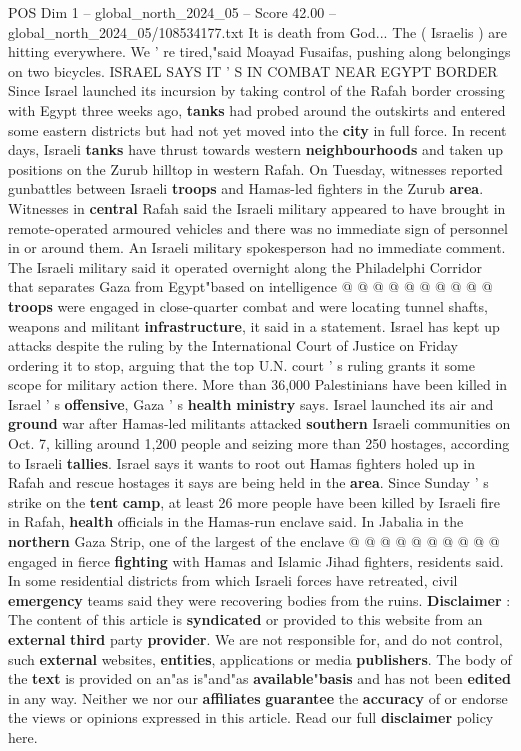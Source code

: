\begin{textsample}{POS Dim 1 – global\_north\_2024\_05 – Score 42.00 – global\_north\_2024\_05/108534177.txt}
It is death from God...
The ( Israelis ) are hitting everywhere.
We ' re tired,"said Moayad Fusaifas, pushing along belongings on two bicycles.
ISRAEL SAYS IT ' S IN COMBAT NEAR EGYPT BORDER Since Israel launched its incursion by taking control of the Rafah border crossing with Egypt three weeks ago, \textbf{tanks} had probed around the outskirts and entered some eastern districts but had not yet moved into the \textbf{city} in full force.
In recent days, Israeli \textbf{tanks} have thrust towards western \textbf{neighbourhoods} and taken up positions on the Zurub hilltop in western Rafah.
On Tuesday, witnesses reported gunbattles between Israeli \textbf{troops} and Hamas-led fighters in the Zurub \textbf{area}.
Witnesses in \textbf{central} Rafah said the Israeli military appeared to have brought in remote-operated armoured vehicles and there was no immediate sign of personnel in or around them.
An Israeli military spokesperson had no immediate comment.
The Israeli military said it operated overnight along the Philadelphi Corridor that separates Gaza from Egypt"based on intelligence @ @ @ @ @ @ @ @ @ @ \textbf{troops} were engaged in close-quarter combat and were locating tunnel shafts, weapons and militant \textbf{infrastructure}, it said in a statement.
Israel has kept up attacks despite the ruling by the International Court of Justice on Friday ordering it to stop, arguing that the top U.N. court ' s ruling grants it some scope for military action there.
More than 36,000 Palestinians have been killed in Israel ' s \textbf{offensive}, Gaza ' s \textbf{health} \textbf{ministry} says.
Israel launched its air and \textbf{ground} war after Hamas-led militants attacked \textbf{southern} Israeli communities on Oct. 7, killing around 1,200 people and seizing more than 250 hostages, according to Israeli \textbf{tallies}.
Israel says it wants to root out Hamas fighters holed up in Rafah and rescue hostages it says are being held in the \textbf{area}.
Since Sunday ' s strike on the \textbf{tent} \textbf{camp}, at least 26 more people have been killed by Israeli fire in Rafah, \textbf{health} officials in the Hamas-run enclave said.
In Jabalia in the \textbf{northern} Gaza Strip, one of the largest of the enclave @ @ @ @ @ @ @ @ @ @ engaged in fierce \textbf{fighting} with Hamas and Islamic Jihad fighters, residents said.
In some residential districts from which Israeli forces have retreated, civil \textbf{emergency} teams said they were recovering bodies from the ruins. \textbf{Disclaimer} : The content of this article is \textbf{syndicated} or provided to this website from an \textbf{external} \textbf{third} party \textbf{provider}.
We are not responsible for, and do not control, such \textbf{external} websites, \textbf{entities}, applications or media \textbf{publishers}.
The body of the \textbf{text} is provided on an"as is"and"as \textbf{available}"\textbf{basis} and has not been \textbf{edited} in any way.
Neither we nor our \textbf{affiliates} \textbf{guarantee} the \textbf{accuracy} of or endorse the views or opinions expressed in this article.
Read our full \textbf{disclaimer} policy here.


\end{textsample}
